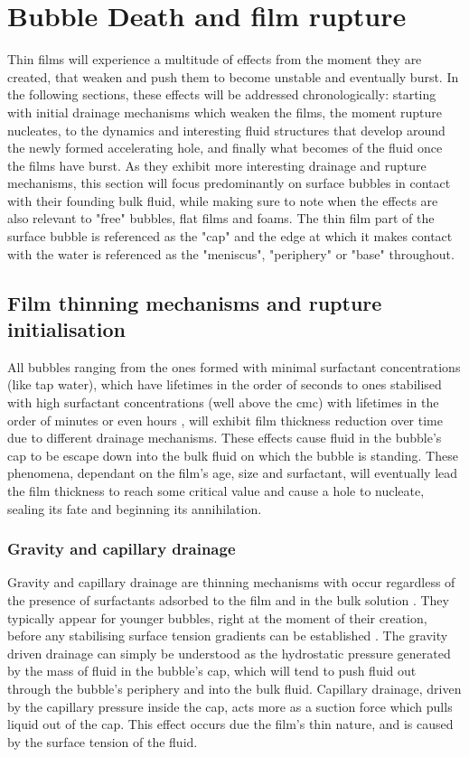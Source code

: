 \documentclass[a4paper,12pt]{article}
\numberwithin{equation}{section}
\numberwithin{figure}{section}
\numberwithin{table}{section}
\begin{document}
\section{Bubble Death and film rupture}
Thin films will experience a multitude of effects from the moment they are created, that weaken and push them to become unstable and eventually burst. In the following sections, these effects will be addressed chronologically: starting with initial drainage mechanisms which weaken the films, the moment rupture nucleates, to the dynamics and interesting fluid structures that develop around the newly formed accelerating hole, and finally what becomes of the fluid once the films have burst. As they exhibit more interesting drainage and rupture mechanisms, this section will focus predominantly on surface bubbles in contact with their founding bulk fluid, while making sure to note when the effects are also relevant to "free" bubbles, flat films and foams. The thin film part of the surface bubble is referenced as the "cap" and the edge at which it makes contact with the water is referenced as the "meniscus", "periphery" or "base" throughout.

\subsection{Film thinning mechanisms and rupture initialisation}
\label{sec:drainage}
All bubbles ranging from the ones formed with minimal surfactant concentrations (like tap water), which have lifetimes in the order of seconds \cite{Zheng1983, Lhuissier2011} to ones stabilised with high surfactant concentrations (well above the cmc) with lifetimes in the order of minutes or even hours \cite{Bhamla2017}, will exhibit film thickness reduction over time due to different drainage mechanisms. These effects cause fluid in the bubble's cap to be escape down into the bulk fluid on which the bubble is standing. These phenomena, dependant on the film's age, size and surfactant, will eventually lead the film thickness to reach some critical value and cause a hole to nucleate, sealing its fate and beginning its annihilation.

\subsubsection{Gravity and capillary drainage}
\label{sec:GravNCap}
Gravity and capillary drainage are thinning mechanisms with occur regardless of the presence of surfactants adsorbed to the film and in the bulk solution \cite{Lhuissier2011}. They typically appear for younger bubbles, right at the moment of their creation, before any stabilising surface tension gradients can be established \cite{Bhamla2017, Lhuissier2011}. The gravity driven drainage can simply be understood as the hydrostatic pressure generated by the mass of fluid in the bubble's cap, which will tend to push fluid out through the bubble's periphery and into the bulk fluid. Capillary drainage, driven by the capillary pressure inside the cap, acts more as a suction force which pulls liquid out of the cap. This effect occurs due the film's thin nature, and is caused by the surface tension of the fluid.
\end{document}
